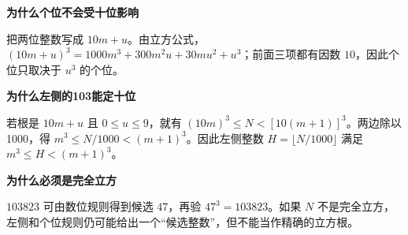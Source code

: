 \clearpage
\begin{explanationbox}
\textbf{\textcolor{CExplanation}{为什么个位不会受十位影响}}
\par\medskip
\begin{center}

\end{center}
\medskip
把两位整数写成 $10m+u$。由立方公式，$(10m+u)^3=1000m^3+300m^2u+30mu^2+u^3$；前面三项都有因数 $10$，因此个位只取决于 $u^3$ 的个位。
\end{explanationbox}
\clearpage
\begin{explanationbox}
\textbf{\textcolor{CExplanation}{为什么左侧的103能定十位}}
\par\medskip
\begin{center}

\end{center}
\medskip
若根是 $10m+u$ 且 $0\le u\le9$，就有 $(10m)^3\le N<[10(m+1)]^3$。两边除以1000，得 $m^3\le N/1000<(m+1)^3$。因此左侧整数 $H=\lfloor N/1000\rfloor$ 满足 $m^3\le H<(m+1)^3$。
\end{explanationbox}
\clearpage
\begin{explanationbox}
\textbf{\textcolor{CExplanation}{为什么必须是完全立方}}
\par\medskip
\begin{center}

\end{center}
\medskip
$103823$ 可由数位规则得到候选 $47$，再验 $47^3=103823$。如果 $N$ 不是完全立方，左侧和个位规则仍可能给出一个“候选整数”，但不能当作精确的立方根。
\end{explanationbox}
